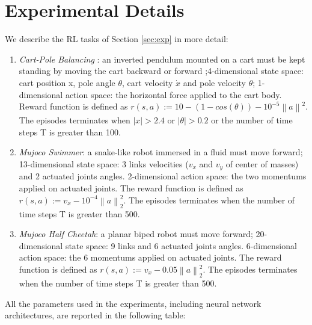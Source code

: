 \documentclass{article}
\theoremstyle{remark}
\theoremstyle{definition}
\newcommand{\norm}[2][\infty]{\left\|#2\right\|_{#1}}
\begin{document}
\section{Experimental Details}\label{app:exp}
We describe the RL tasks of Section \ref{sec:exp} in more detail:
\begin{enumerate}
	\item \emph{Cart-Pole Balancing} : an inverted pendulum mounted on a cart must be kept standing by moving the cart backward or forward ;4-dimensional state space: cart position x, pole angle $\theta$, cart velocity $\dot{x}$ and pole velocity $\dot{\theta}$; 1-dimensional action space: the horizontal force applied to the cart body. Reward function  is defined as $r(s, a) := 10 - (1 - cos(\theta)) - 10^{-5}\norm[] a^2$. The episodes terminates when $|x|>2.4$ or $|\theta|>0.2$ or the number of time steps T is greater than 100.
    \item \emph{Mujoco Swimmer}: a snake-like robot immersed in a fluid must move forward; 13-dimensional state space: 3 links velocities ($v_x$ and $v_y$ of center of masses) and 2 actuated joints angles. 2-dimensional action space: the two momentums applied on actuated joints.  The reward function is defined as $r(s, a) := v_x - 10^{-4}\norm[2]{a}^2$. The episodes terminates when the number of time steps T is greater than 500.
    \item \emph{Mujoco Half Cheetah}: a planar biped robot must move forward; 20-dimensional state space: 9 links and 6 actuated joints angles. 6-dimensional action space: the 6 momentums applied on actuated joints.  The reward function is defined as $r(s, a) := v_x - 0.05\norm[2]{a}^2$. The episodes terminates when the number of time steps T is greater than 500.
\end{enumerate}

All the parameters used in the experiments, including neural network architectures, are reported in the following table:
\end{document}
